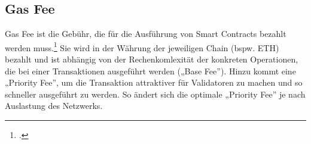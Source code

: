 \subsection{Gas Fee}
\label{sec:definition-gas-fee}
Gas Fee ist die Gebühr, die für die Ausführung von Smart Contracts bezahlt werden muss.\footcite[Vgl. hierzu und zum Folgenden][]{w31} 
Sie wird in der Währung der jeweiligen Chain (bspw. ETH) bezahlt und ist abhängig von der Rechenkomlexität der konkreten Operationen, die bei einer Transaktionen ausgeführt werden („Base Fee”).
Hinzu kommt eine „Priority Fee”, um die Transaktion attraktiver für Validatoren zu machen und so schneller ausgeführt zu werden.
So ändert sich die optimale „Priority Fee” je nach Auslastung des Netzwerks. 